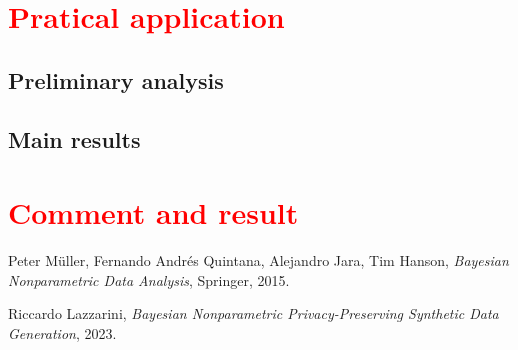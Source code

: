 \documentclass{article}
\begin{document}
\cite{libro}

\section{\textcolor{red}{Pratical application}}
\subsection{Preliminary analysis}
\subsection{Main results}

\section{\textcolor{red}{Comment and result}}


\begin{thebibliography}{99}

 Peter Müller, Fernando Andrés Quintana, Alejandro Jara, Tim Hanson, \textit{Bayesian Nonparametric Data Analysis}, Springer, 2015.

 Riccardo Lazzarini, \textit{Bayesian Nonparametric Privacy-Preserving Synthetic Data Generation}, 2023.



\end{thebibliography}
\end{document}
